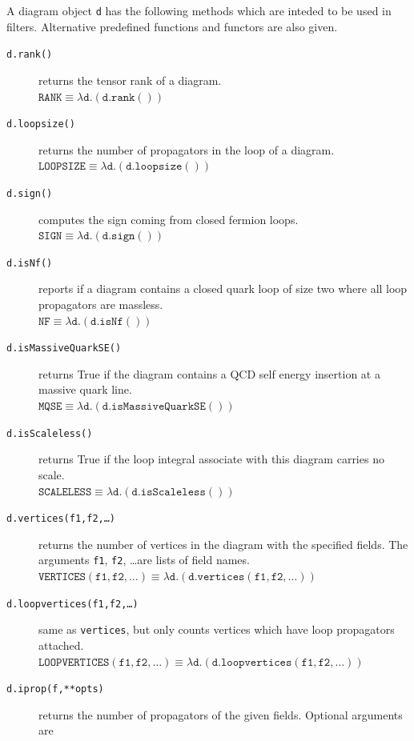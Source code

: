 \documentclass[11pt,a4paper]{refrep}
\begin{document}
A diagram object \texttt{d} has the following methods which are inteded
to be used in filters.
Alternative predefined functions and functors are also given.
\begin{description}
\item[\texttt{d.rank()}] returns the tensor rank of a diagram.\\
   $\mathtt{RANK}\equiv\lambda\mathtt{d}.(\mathtt{d.rank()})$
\item[\texttt{d.loopsize()}] returns the number of propagators
   in the loop of a diagram.\\
   $\mathtt{LOOPSIZE}\equiv\lambda\mathtt{d}.(\mathtt{d.loopsize()})$
\item[\texttt{d.sign()}] computes the sign coming from closed
   fermion loops.\\
   $\mathtt{SIGN}\equiv\lambda\mathtt{d}.(\mathtt{d.sign()})$
\item[\texttt{d.isNf()}] reports if a diagram contains a closed
   quark loop of size two where all loop propagators are massless.\\
   $\mathtt{NF}\equiv\lambda\mathtt{d}.(\mathtt{d.isNf()})$
\item[\texttt{d.isMassiveQuarkSE()}] returns True if the diagram
   contains a QCD self energy insertion at a massive quark line.\\
   $\mathtt{MQSE}\equiv\lambda\mathtt{d}.(\mathtt{d.isMassiveQuarkSE()})$
\item[\texttt{d.isScaleless()}] returns True if the loop integral associate
   with this diagram carries no scale.\\
   $\mathtt{SCALELESS}\equiv\lambda\mathtt{d}.(\mathtt{d.isScaleless()})$
\item[\texttt{d.vertices(f1,f2,\ldots)}] returns the number of vertices
   in the diagram with the specified fields. The arguments \texttt{f1},
   \texttt{f2}, \dots are lists of field names.\\
   $\mathtt{VERTICES(f1,f2,\ldots)}\equiv
    \lambda\mathtt{d}.(\mathtt{d.vertices(\mathtt{f1},\mathtt{f2},\ldots)})$
\item[\texttt{d.loopvertices(f1,f2,\ldots)}]
   same as \texttt{vertices}, but only counts vertices which have
   loop propagators attached.\\
   $\mathtt{LOOPVERTICES(f1,f2,\ldots)}\equiv
    \lambda\mathtt{d}.(\mathtt{d.loopvertices(
    \mathtt{f1},\mathtt{f2},\ldots)})$
\item[\texttt{d.iprop(f,**opts)}] returns the number of propagators
   of the given fields. Optional arguments are

\end{description}
\end{document}

